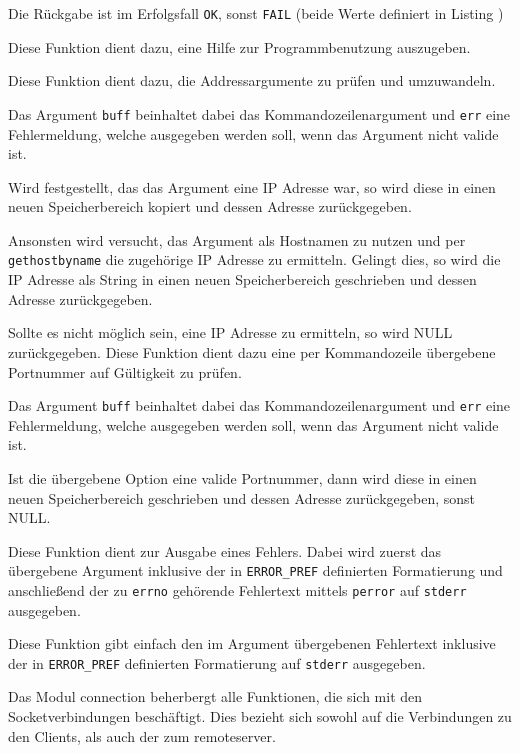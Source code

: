 Die R\"{u}ckgabe ist im Erfolgsfall \texttt{OK}, sonst \texttt{FAIL} (beide Werte definiert in Listing )

\label{fn:write_help}
Diese Funktion dient dazu, eine Hilfe zur Programmbenutzung auszugeben.

\label{fn:host_opt}
Diese Funktion dient dazu, die Addressargumente zu pr\"{u}fen und umzuwandeln.

Das Argument \texttt{buff} beinhaltet dabei das Kommandozeilenargument und \texttt{err} eine Fehlermeldung, welche ausgegeben werden soll, wenn das Argument nicht valide ist.

Wird festgestellt, das das Argument eine IP Adresse war, so wird diese in einen neuen Speicherbereich kopiert und dessen Adresse zur\"{u}ckgegeben.

Ansonsten wird versucht, das Argument als Hostnamen zu nutzen und per \texttt{gethostbyname} die zugeh\"{o}rige IP Adresse zu ermitteln. Gelingt dies, so wird die IP Adresse als String in einen neuen Speicherbereich geschrieben und dessen Adresse zur\"{u}ckgegeben.

Sollte es nicht m\"{o}glich sein, eine IP Adresse zu ermitteln, so wird NULL zur\"{u}ckgegeben.
\label{fn:port_opt}
Diese Funktion dient dazu eine per Kommandozeile \"{u}bergebene Portnummer auf G\"{u}ltigkeit zu pr\"{u}fen.

Das Argument \texttt{buff} beinhaltet dabei das Kommandozeilenargument und \texttt{err} eine Fehlermeldung, welche ausgegeben werden soll, wenn das Argument nicht valide ist.

Ist die \"{u}bergebene Option eine valide Portnummer, dann wird diese in einen neuen Speicherbereich geschrieben und dessen Adresse zur\"{u}ckgegeben, sonst NULL.

\label{fn:put_err}
Diese Funktion dient zur Ausgabe eines Fehlers. Dabei wird zuerst das \"{u}bergebene Argument inklusive der in \texttt{ERROR\_PREF} definierten Formatierung und anschließend der zu \texttt{errno} geh\"{o}rende Fehlertext mittels \texttt{perror} auf \texttt{stderr} ausgegeben.

\label{fn:put_err_str}
Diese Funktion gibt einfach den im Argument \"{u}bergebenen Fehlertext inklusive der in \texttt{ERROR\_PREF} definierten Formatierung auf \texttt{stderr} ausgegeben.

\label{mod:connection}
Das Modul connection beherbergt alle Funktionen, die sich mit den Socketverbindungen besch\"{a}ftigt. Dies bezieht sich sowohl auf die Verbindungen zu den Clients, als auch der zum remoteserver.

